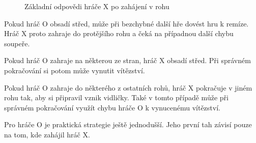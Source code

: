 \documentclass[12pt,a4paper]{article}
\begin{document}
\begin{figure}[h]
\begin{center}
    \end{center}

    \caption{Základní odpovědi hráče $\mathrm{X}$ po zahájení v rohu}
    \label{fig:TicTacToeShrnutiX}
\end{figure}

Pokud hráč $\mathrm{O}$ obsadí střed, může při bezchybné další hře dovést hru k remíze.
Hráč $\mathrm{X}$ proto zahraje do protějšího rohu a čeká na případnou další chybu soupeře.

Pokud hráč $\mathrm{O}$ zahraje na některou ze stran, hráč $\mathrm{X}$ obsadí střed.
Při správném pokračování si potom může vynutit vítězství.

Pokud hráč $\mathrm{O}$ zahraje do některého z ostatních rohů, 
hráč $\mathrm{X}$ pokračuje v jiném rohu tak, aby si připravil vznik vidličky.
Také v tomto případě může při správném pokračování využít chybu 
hráče $\mathrm{O}$ k vynucenému vítězství.

Pro hráče $\mathrm{O}$ je praktická strategie ještě jednodušší.
Jeho první tah závisí pouze na tom, kde zahájil hráč $\mathrm{X}$.
\end{document}
